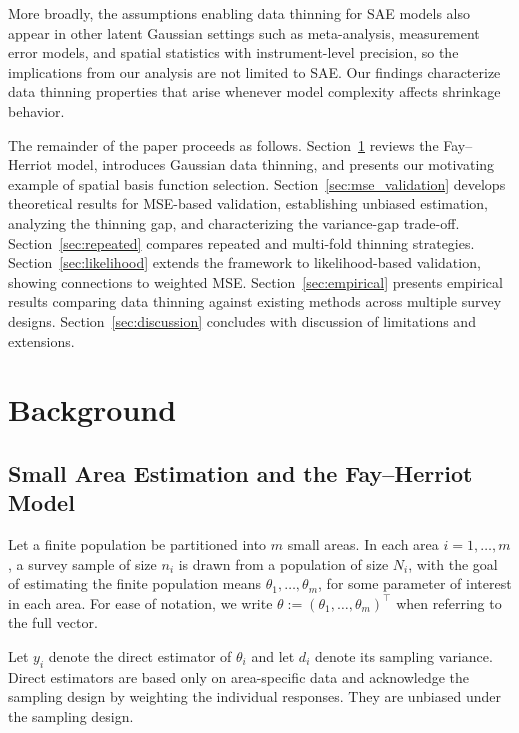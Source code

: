 \documentclass[11pt]{article}
\theoremstyle{plain}
\theoremstyle{definition}
\theoremstyle{remark}
\begin{document}
More broadly, the assumptions enabling data thinning for SAE models also appear in other latent Gaussian settings such as meta-analysis, measurement error models, and spatial statistics with instrument-level precision, so the implications from our analysis are not limited to SAE. Our findings characterize data thinning properties that arise whenever model complexity affects shrinkage behavior.

The remainder of the paper proceeds as follows. Section~\ref{sec:background} reviews the Fay--Herriot model, introduces Gaussian data thinning, and presents our motivating example of spatial basis function selection. Section~\ref{sec:mse_validation} develops theoretical results for MSE-based validation, establishing unbiased estimation, analyzing the thinning gap, and characterizing the variance-gap trade-off. Section~\ref{sec:repeated} compares repeated and multi-fold thinning strategies. Section~\ref{sec:likelihood} extends the framework to likelihood-based validation, showing connections to weighted MSE. Section~\ref{sec:empirical} presents empirical results comparing data thinning against existing methods across multiple survey designs. Section~\ref{sec:discussion} concludes with discussion of limitations and extensions.

\section{Background} \label{sec:background}


\subsection{Small Area Estimation and the Fay--Herriot Model}

 Let a finite population be partitioned into $m$ small areas. In each area $i=1,\dots,m$, a survey sample of size $n_i$ is drawn from a population of size $N_i$, with the goal of estimating the finite population means $\theta_1, \ldots, \theta_m$, for some parameter of interest in each area. For ease of notation, we write $\theta := (\theta_1, \ldots, \theta_m)^\top$ when referring to the full vector.

Let $y_i$ denote the direct estimator of $\theta_i$ and let $d_i$ denote its sampling variance. Direct estimators are based only on area-specific data and acknowledge the sampling design by weighting the individual responses. They are unbiased under the sampling design.
\end{document}
